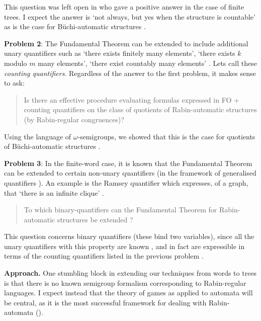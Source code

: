 \documentclass{article}
\theoremstyle{plain} \numberwithin{equation}{section}
\theoremstyle{definition}
\begin{document}
This question was left open in \cite{CoLo06} who gave a positive answer in the case of finite trees.
I expect the answer is `not always, but yes when the structure is countable' as is the case for B{\"u}chi-automatic structures \cite{HKMN07,BKRu08}.

\medskip

{\bf Problem 2}:
The Fundamental Theorem can be extended to include additional unary quantifiers such as `there exists finitely many elements', `there exists $k$ modulo $m$ many elements', `there exist countably many elements' \cite{BKRa}. Lets call these {\em counting quantifiers}. Regardless of the answer to the first problem, it makes sense to ask:

\begin{quote}
Is there an effective procedure evaluating formulas expressed in FO + counting quantifiers on the class of quotients of Rabin-automatic structures (by Rabin-regular congruences)?
\end{quote}

Using the language of $\omega$-semigroups, we showed that this is the case for quotients of B{\"u}chi-automatic structures \cite{BKRu08}.

\medskip

{\bf Problem 3}:
In the finite-word case, it is known that the Fundamental Theorem can be extended to certain non-unary quantifiers (in the framework of generalised quantifiers \cite{Hell96}). An example is the Ramsey quantifier which expresses, of a graph, that `there is an infinite clique' \cite{Rubi08}.


\begin{quote}
To which binary-quantifiers can the Fundamental Theorem for Rabin-automatic structures be extended ?
\end{quote}

This question concerns binary quantifiers (these bind two variables), since all the unary quantifiers with this property are known \cite{KuLo05}, and in fact are expressible in terms of the counting quantifiers listed in the previous problem \cite{Rubi08}.

\medskip

{\bf Approach.}
One stumbling block in extending our techniques from words to trees is that there is no known semigroup formalism corresponding to Rabin-regular languages. I expect instead that the theory of games as applied to automata will be central, as it is the most successful framework for dealing with Rabin-automata (\cite{GTW02}).

\begin{small}


\end{small}
\end{document}
